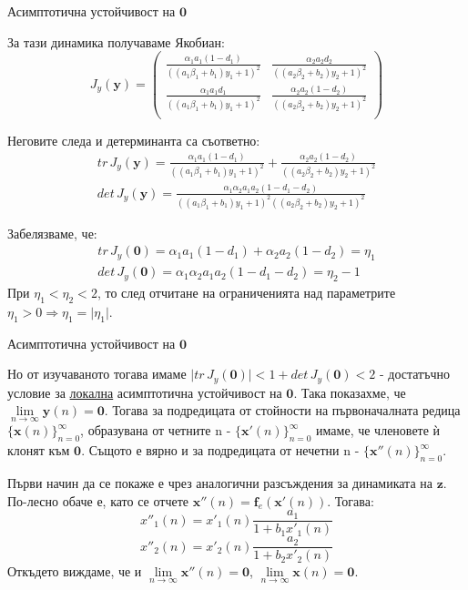 \begin{frame}[t]{Асимптотична устойчивост на $\mathbf{0}$}

За тази динамика получаваме Якобиан:
\[J_{y}(\mathbf{y})=\left(
\begin{array}{cc}
 \frac{\alpha_{1} a_{1} (1-d_{1})}{((a_{1} \beta_{1} + b_{1}) y_{1} + 1)^2} & \frac{\alpha_{2} a_{2} d_{2}}{((a_{2} \beta_{2} + b_{2}) y_{2} + 1)^2} 
 \\
 \frac{\alpha_{1} a_{1} d_{1}}{((a_{1} \beta_{1} + b_{1}) y_{1} + 1)^2} & \frac{\alpha_{2} a_{2} (1-d_{2})}{((a_{2} \beta_{2} + b_{2}) y_{2} + 1)^2} 
 \\
\end{array}
\right)\]

Неговите следа и детерминанта са съответно:
\[\begin{array}{c}
tr \, J_{y}(\mathbf{y}) = \frac{\alpha_{1} a_{1} (1-d_{1})}{((a_{1} \beta_{1} + b_{1}) y_{1} + 1)^2} +  \frac{\alpha_{2} a_{2} (1-d_{2})}{((a_{2} \beta_{2} + b_{2}) y_{2} + 1)^2} \\
det \, J_{y}(\mathbf{y}) = \frac{\alpha_{1} \alpha_{2} a_{1} a_{2} (1 - d_{1} - d_{2})}
{((a_{1} \beta_{1} + b_{1}) y_{1} + 1)^2 ((a_{2} \beta_{2} + b_{2}) y_{2} + 1)^2}
\end{array}\]

Забелязваме, че:
\[\begin{array}{c}
tr \, J_{y}(\mathbf{0}) = \alpha_{1} a_{1} (1-d_{1}) + \alpha_{2} a_{2} (1-d_{2}) = \eta_{1} \\
det \, J_{y}(\mathbf{0}) = \alpha_{1} \alpha_{2} a_{1} a_{2} (1 - d_{1} - d_{2}) =\eta_{2} - 1
\end{array}\]
При $\eta_{1} < \eta_{2} < 2$, то след отчитане на ограниченията над параметрите $\eta_{1} > 0  \Rightarrow \eta_{1} = \lvert \eta_{1} \rvert$.

\end{frame}

\begin{frame}[t]{Асимптотична устойчивост на $\mathbf{0}$}

Но от изучаваното тогава имаме $\lvert tr \, J_{y}(\mathbf{0}) \rvert < 1 + det \, J_{y}(\mathbf{0}) < 2$ - достатъчно условие за \underline{локална} асимптотична устойчивост на $\mathbf{0}$. Така показахме, че $\lim\limits_{n \to \infty} \mathbf{y}(n) = \mathbf{0}$. Тогава за подредицата от стойности на първоначалната редица $\{\mathbf{x}(n)\}_{n=0}^{\infty}$, образувана от четните n  - $\{\mathbf{x}'(n)\}_{n=0}^{\infty}$ имаме, че членовете ѝ клонят към $\mathbf{0}$.
Същото е вярно и за подредицата от нечетни n - $\{\mathbf{x}''(n)\}_{n=0}^{\infty}$.

Първи начин да се покаже е чрез аналогични разсъждения за динамиката на $\mathbf{z}$. По-лесно обаче е, като се отчете $\mathbf{x}''(n)=\mathbf{f}_{e}(\mathbf{x}'(n))$. Тогава: 
\[x''_{1}(n)=x'_{1}(n)\frac{a_{1}}{1+b_{1} x'_{1}(n)}\]
\[x''_{2}(n)=x'_{2}(n)\frac{a_{2}}{1+b_{2} x'_{2}(n)}\]
Откъдето виждаме, че и $\lim\limits_{n \to \infty}\mathbf{x''}(n) = \mathbf{0}$, $\lim\limits_{n \to \infty}\mathbf{x}(n) = \mathbf{0}$.

\end{frame}

